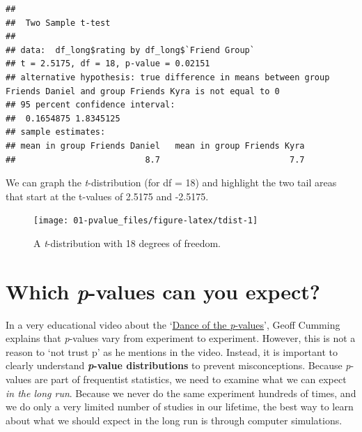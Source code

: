 \documentclass[
  oneside]{krantz}
\makeatletter
\newenvironment{Shaded}{\begin{snugshade}}{\end{snugshade}}
\newcommand{\AttributeTok}[1]{\textcolor[rgb]{0.61,0.61,0.61}{#1}}
\newcommand{\ConstantTok}[1]{\textcolor[rgb]{0,0,0}{#1}}
\newcommand{\FunctionTok}[1]{\textcolor[rgb]{0,0,0}{#1}}
\newcommand{\NormalTok}[1]{#1}
\newcommand{\SpecialCharTok}[1]{\textcolor[rgb]{0,0,0}{#1}}
\newcommand{\StringTok}[1]{\textcolor[rgb]{0.5,0.5,0.5}{#1}}
\newenvironment{kframe}{%
\medskip{}
\setlength{\fboxsep}{.8em}
 \def\at@end@of@kframe{}%
 \ifinner\ifhmode%
  \def\at@end@of@kframe{\end{minipage}}%
  \begin{minipage}{\columnwidth}%
 \fi\fi%
 \def\FrameCommand##1{\hskip\@totalleftmargin \hskip-\fboxsep
 \colorbox{shadecolor}{##1}\hskip-\fboxsep
     \hskip-\linewidth \hskip-\@totalleftmargin \hskip\columnwidth}%
 \MakeFramed {\advance\hsize-\width
   \@totalleftmargin\z@ \linewidth\hsize
   \@setminipage}}%
 {\par\unskip\endMakeFramed%
 \at@end@of@kframe}
\renewenvironment{Shaded}{\begin{kframe}}{\end{kframe}}
\makeatother
\begin{document}
\begin{Shaded}
\end{Shaded}

\begin{verbatim}
## 
##  Two Sample t-test
## 
## data:  df_long$rating by df_long$`Friend Group`
## t = 2.5175, df = 18, p-value = 0.02151
## alternative hypothesis: true difference in means between group Friends Daniel and group Friends Kyra is not equal to 0
## 95 percent confidence interval:
##  0.1654875 1.8345125
## sample estimates:
## mean in group Friends Daniel   mean in group Friends Kyra 
##                          8.7                          7.7
\end{verbatim}

We can graph the \emph{t}-distribution (for df = 18) and highlight the two tail areas that start at the t-values of 2.5175 and -2.5175.



\begin{figure}

{\centering \texttt{[image: 01-pvalue\_files/figure-latex/tdist-1]} 

}

\caption{A \emph{t}-distribution with 18 degrees of freedom.}\label{fig:tdist}
\end{figure}

\hypertarget{whichpexpect}{%
\section{\texorpdfstring{Which \emph{p}-values can you expect?}{Which p-values can you expect?}}\label{whichpexpect}}

In a very educational video about the `\href{https://www.youtube.com/watch?v=5OL1RqHrZQ8}{Dance of the \emph{p}-values}', Geoff Cumming explains that \emph{p}-values vary from experiment to experiment. However, this is not a reason to `not trust p' as he mentions in the video. Instead, it is important to clearly understand \textbf{\emph{p}-value distributions} to prevent misconceptions. Because \emph{p}-values are part of frequentist statistics, we need to examine what we can expect \emph{in the long run}. Because we never do the same experiment hundreds of times, and we do only a very limited number of studies in our lifetime, the best way to learn about what we should expect in the long run is through computer simulations.
\end{document}
